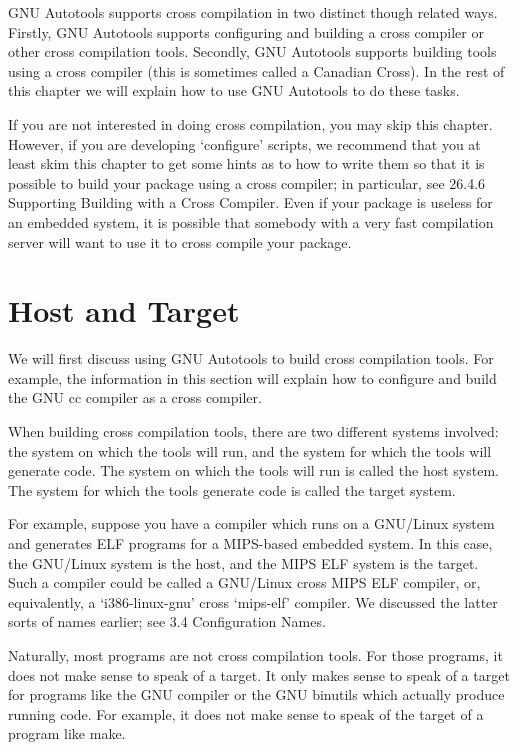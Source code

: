 GNU Autotools supports cross compilation in two distinct though related ways. Firstly, GNU Autotools supports configuring and building a cross compiler or other cross compilation tools. Secondly, GNU Autotools supports building tools using a cross compiler (this is sometimes called a Canadian Cross). In the rest of this chapter we will explain how to use GNU Autotools to do these tasks.

If you are not interested in doing cross compilation, you may skip this chapter. However, if you are developing `configure' scripts, we recommend that you at least skim this chapter to get some hints as to how to write them so that it is possible to build your package using a cross compiler; in particular, see 26.4.6 Supporting Building with a Cross Compiler. Even if your package is useless for an embedded system, it is possible that somebody with a very fast compilation server will want to use it to cross compile your package. 


\section{Host and Target}

We will first discuss using GNU Autotools to build cross compilation tools. For example, the information in this section will explain how to configure and build the GNU cc compiler as a cross compiler.

When building cross compilation tools, there are two different systems involved: the system on which the tools will run, and the system for which the tools will generate code. The system on which the tools will run is called the host system. The system for which the tools generate code is called the target system.

For example, suppose you have a compiler which runs on a GNU/Linux system and generates ELF programs for a MIPS-based embedded system. In this case, the GNU/Linux system is the host, and the MIPS ELF system is the target. Such a compiler could be called a GNU/Linux cross MIPS ELF compiler, or, equivalently, a `i386-linux-gnu' cross `mips-elf' compiler. We discussed the latter sorts of names earlier; see 3.4 Configuration Names.

Naturally, most programs are not cross compilation tools. For those programs, it does not make sense to speak of a target. It only makes sense to speak of a target for programs like the GNU compiler or the GNU binutils which actually produce running code. For example, it does not make sense to speak of the target of a program like make.

